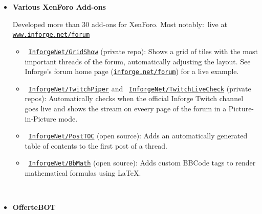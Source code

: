 \begin{itemize}
	\renewcommand{\labelitemi}{\color{cvred}\faArrowCircleRight}
	\setlength{\itemsep}{1em}
	\item \textbf{Various XenForo Add-ons}\hfill{}\newline
		{\color{black!70}\footnotesize Developed more than 30 add-ons
		for XenForo. Most notably:\hfill{\color{black!70}\faGlobe~{\footnotesize live at}
		\href{https://www.inforge.net/forum/}{\texttt{www.inforge.net/forum}}}~~~~\phantom\partialprivatetag
		\begin{itemize}
			\item \faGithub~\href{https://github.com/InforgeNet/GridShow}{\texttt{InforgeNet/GridShow}}
				(\textcolor{cvred}{private repo}): Shows a grid
				of tiles with the most important threads of the
				forum, automatically adjusting the layout. See
				Inforge's forum home page
				(\href{https://www.inforge.net/forum/}{\texttt{inforge.net/forum}})
				for a live example.
			\item \faGithub~\href{https://github.com/InforgeNet/TwitchPiper}{\texttt{InforgeNet/TwitchPiper}}
				and
				\faGithub~\href{https://github.com/InforgeNet/TwitchLiveCheck}{\texttt{InforgeNet/TwitchLiveCheck}}
				(\textcolor{cvred}{private repos}):
				Automatically checks when the official
				Inforge Twitch channel goes live and shows the
				stream on eveery page of the forum in a
				Picture-in-Picture mode.
			\item \faGithub~\href{https://github.com/InforgeNet/PostTOC}{\texttt{InforgeNet/PostTOC}}
				(\textcolor{cvgreen}{open source}): Adds an
				automatically generated table of contents to
				the first post of a thread.
			\item \faGithub~\href{https://github.com/InforgeNet/BbMath}{\texttt{InforgeNet/BbMath}}
				(\textcolor{cvgreen}{open source}): Adds custom
				BBCode tags to render mathematical formulas
				using LaTeX.
		\end{itemize}}
		\\
	\item \textbf{OfferteBOT}\hfill{}\newline

\end{itemize}
